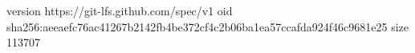 version https://git-lfs.github.com/spec/v1
oid sha256:aeeaefc76ac41267b2142fb4be372cf4c2b06ba1ea57ccafda924f46c9681e25
size 113707
